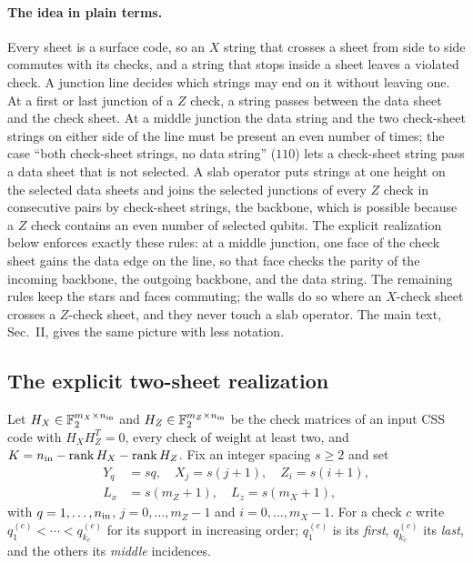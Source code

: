 \documentclass[aps,prx,reprint,superscriptaddress,nofootinbib,floatfix,longbibliography]{revtex4-2}
\theoremstyle{definition}
\DeclareMathOperator{\rank}{rank}
\begin{document}
\paragraph{The idea in plain terms.}
Every sheet is a surface code, so an $X$ string that crosses a sheet from
side to side commutes with its checks, and a string that stops inside a sheet
leaves a violated check.  A junction line decides which strings may end on it
without leaving one.  At a first or last junction of a $Z$ check, a string
passes between the data sheet and the check sheet.  At a middle junction the
data string and the two check-sheet strings on either side of the line must
be present an even number of times; the case ``both check-sheet strings, no
data string'' ($110$) lets a check-sheet string pass a data sheet that is not
selected.  A slab operator puts strings at one height on the selected data
sheets and joins the selected junctions of every $Z$ check in consecutive
pairs by check-sheet strings, the backbone, which is possible because a $Z$
check contains an even number of selected qubits.  The explicit realization
below enforces exactly these rules: at a middle junction, one face of the
check sheet gains the data edge on the line, so that face checks the parity
of the incoming backbone, the outgoing backbone, and the data string.  The
remaining rules keep the stars and faces commuting; the walls do so where an
$X$-check sheet crosses a $Z$-check sheet, and they never touch a slab
operator.  The main text, Sec.~II, gives the same picture with less notation.

\subsection{The explicit two-sheet realization}
\label{sec:explicit-realization}

Let $H_X\in\mathbb F_2^{m_X\times n_{\rm in}}$ and
$H_Z\in\mathbb F_2^{m_Z\times n_{\rm in}}$ be the check matrices of an input
CSS code with $H_XH_Z^T=0$, every check of weight at least two, and
$K=n_{\rm in}-\rank H_X-\rank H_Z$.  Fix an integer spacing $s\ge2$ and set
\begin{align}
 Y_q&=sq,\quad X_j=s(j+1),\quad Z_i=s(i+1),\nonumber\\
 L_x&=s(m_Z+1),\quad L_z=s(m_X+1),
 \label{eq:explicit-coords}
\end{align}
with $q=1,\dots,n_{\rm in}$, $j=0,\dots,{m_Z-1}$ and $i=0,\dots,{m_X-1}$.
For a check $c$ write $q_1^{(c)}<\cdots<q_{k_c}^{(c)}$ for its support in
increasing order; $q_1^{(c)}$ is its \emph{first}, $q_{k_c}^{(c)}$ its
\emph{last}, and the others its \emph{middle} incidences.
\end{document}
